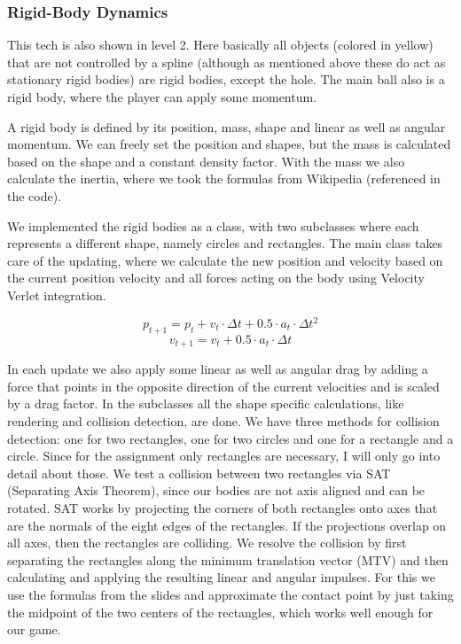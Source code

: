 \documentclass{article}
\begin{document}
\subsubsection{Rigid-Body Dynamics}

This tech is also shown in level 2. Here basically all objects (colored in yellow) that are not controlled by a spline (although as mentioned above these do act as stationary rigid bodies) are rigid bodies, except the hole.
The main ball also is a rigid body, where the player can apply some momentum. 

A rigid body is defined by its position, mass, shape and linear as well as angular momentum. 
We can freely set the position and shapes, but the mass is calculated based on the shape and a constant density factor.
With the mass we also calculate the inertia, where we took the formulas from Wikipedia (referenced in the code).

We implemented the rigid bodies as a class, with two subclasses where each represents a different shape, namely circles and rectangles.
The main class takes care of the updating, where we calculate the new position and velocity
based on the current position velocity and all forces acting on the body using Velocity Verlet integration. 

\[
    p_{t+1} = p_{t} + v_{t} \cdot \Delta t + 0.5 \cdot a_{t} \cdot \Delta t^2 
\]
\[
    v_{t+1} = v_{t} + 0.5 \cdot a_{t} \cdot \Delta t
\]

In each update we also apply some linear as well as angular drag by adding a force that points in the opposite direction
of the current velocities and is scaled by a drag factor.
In the subclasses all the shape specific calculations, like rendering and collision detection, are done.
We have three methods for collision detection: one for two rectangles, one for two circles and one for 
a rectangle and a circle. 
Since for the assignment only rectangles are necessary, I will only go into detail about those. 
We test a collision between two rectangles via SAT (Separating Axis Theorem), since our bodies are not axis aligned and 
can be rotated. SAT works by projecting the corners of both rectangles onto axes that are the normals 
of the eight edges of the rectangles. If the projections overlap on all axes, then the rectangles are colliding.
We resolve the collision by first separating the rectangles along the minimum translation vector (MTV) and then 
calculating and applying the resulting linear and angular impulses.
For this we use the formulas from the slides and approximate the contact point by just taking the midpoint of the two centers of the rectangles, which
works well enough for our game.
\end{document}
